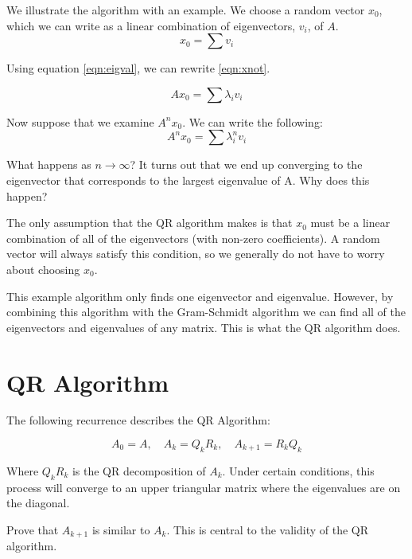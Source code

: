 We illustrate the algorithm with an example. We choose a random vector $x_0$, which we can write as a linear combination of eigenvectors, $v_i$, of $A$.
\begin{equation}
\label{eqn:xnot}
x_0 = \sum v_i
\end{equation}

Using equation \ref{eqn:eigval}, we can rewrite \ref{eqn:xnot}.

\begin{equation*}
Ax_0 = \sum \lambda_i v_i
\end{equation*}

Now suppose that we examine $A^n x_0$. We can write the following:
\begin{equation*}
A^n x_0 = \sum \lambda_i^n v_i
\end{equation*}

What happens as $n \rightarrow \infty$? It turns out that we end up converging to the eigenvector that corresponds to the largest eigenvalue of A. Why does this happen?

The only assumption that the QR algorithm makes is that $x_0$ must be a linear combination of all of the eigenvectors (with non-zero coefficients). A random vector will always satisfy this condition, so we generally do not have to worry about choosing $x_0$.

This example algorithm only finds one eigenvector and eigenvalue. However, by combining this algorithm with the Gram-Schmidt algorithm we can find all of the eigenvectors and eigenvalues of any matrix. This is what the QR algorithm does.

\section*{QR Algorithm}

The following recurrence describes the QR Algorithm:

\begin{equation*}
A_0 = A, \quad A_k = Q_k R_k, \quad A_{k+1} = R_k Q_k
\end{equation*}

Where $Q_k R_k$ is the QR decomposition of $A_k$. Under certain conditions, this process will converge to an upper triangular matrix where the eigenvalues are on the diagonal.

\begin{problem}
Prove that $A_{k+1}$ is similar to $A_k$. This is central to the validity of the QR algorithm.
\end{problem}

